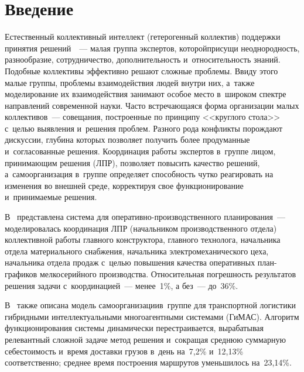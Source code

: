 
  
\vspace*{-1pt}



\thispagestyle{headings}

\begin{multicols}{2}

\label{st\stat}

\section{Введение}

  Естественный коллективный интеллект (ге\-терогенный коллектив) поддержки 
принятия ре\-шений~\cite{1-r}~--- малая группа экспертов, которой\linebreak присущи 
неоднородность, разнообразие, со\-труд\-ничество, дополнительность 
и~относительность знаний. Подобные коллективы эффективно решают 
сложные проблемы. Ввиду этого малые группы, проблемы взаимодействия 
людей внутри них, а~также моделирование их взаимодействия занимают особое 
место в~широком спектре направлений современной науки. Часто 
встречающаяся форма организации малых коллективов~--- совещания, 
построенные по принципу <<круглого стола>>~\cite{3-r} \mbox{с~целью} выявления 
и~решения проб\-лем. Разного рода конфликты порождают дискуссии, глубина 
которых позволяет получить более продуманные и~согласованные решения. 
Координация работы экспертов в~группе лицом, принимающим решения (ЛПР), 
позволяет повысить качество решений, а~самоорганизация в~группе определяет 
способность чутко реагировать на изменения во внешней среде, корректируя 
свое функционирование и~при\-ни\-ма\-емые решения. 
  
  В~\cite{2-r} представлена система для опе\-ра\-тив\-но-про\-из\-вод\-ст\-вен\-но\-го 
планирования~--- моделировалась координация ЛПР (начальником 
производственного отдела) коллективной работы главного конструктора, 
главного технолога, начальника отдела материального снабжения, начальника 
электромеханического цеха, начальника отдела продаж \mbox{с~целью} повышения 
качества оперативных план-гра\-фи\-ков мелкосерийного производства. 
Относительная погрешность результатов решения задачи с~координацией~--- 
менее~1\%, а без~--- до~36\%.
  
  В~\cite{2-r} также описана модель самоорганизации\linebreak в~группе для 
транспортной логистики гибридными интеллектуальными многоагентными 
сис\-те\-ма\-ми (ГиМАС). Алгоритм функционирования сис\-те\-мы динамически 
перестраивается, вырабатывая\linebreak
 релевантный сложной задаче метод решения 
и~сокращая среднюю суммарную се\-бе\-сто\-и\-мость и~время доставки грузов 
в~день на~7,2\% и~12,13\% соответственно; среднее время по\-стро\-ения 
маршрутов уменьшилось на~23,14\%.



\end{multicols}
